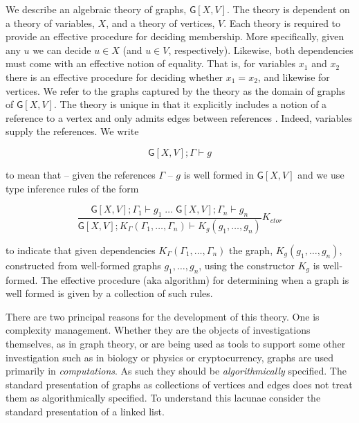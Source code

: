 \documentclass[12pt]{llncs}
\begin{document}
\lstset{language=[Objective]Caml,frame=shadowbox}




We describe an algebraic theory of graphs, \(\mathsf{G}[X,V]\). The
theory is dependent on a theory of variables, \(X\), and a theory of
vertices, \(V\). Each theory is required to provide an effective
procedure for deciding membership. More specifically, given any \(u\) we
can decide \(u \in X\) (and \(u \in V\), respectively). Likewise, both
dependencies must come with an effective notion of equality. That is,
for variables \(x_1\) and \(x_2\) there is an effective procedure for
deciding whether \(x_1 = x_2\), and likewise for vertices. We refer to
the graphs captured by the theory as the domain of graphs of
\(\mathsf{G}[X,V]\). The theory is unique in that it explicitly includes
a notion of a reference to a vertex and only admits edges between
references \cite{DBLP:journals/corr/abs-0809-3023} \cite{DBLP:journals/iandc/DawarGG07} \cite{DBLP:conf/icalp/CardelliGG02} \cite{godsil2013algebraic}. Indeed, variables supply the references. We write

\[\mathsf{G}[X,V];\Gamma \vdash g\]

to mean that -- given the references \(\Gamma\) -- \(g\) is well formed
in \(\mathsf{G}[X,V]\) and we use type inference rules of the form

\[\frac{ \mathsf{G}[X,V]; \Gamma_1 \vdash g_1 \; \ldots \; \mathsf{G}[X,V]; \Gamma_n \vdash g_n}{ \mathsf{G}[X,V]; K_{\Gamma}(\Gamma_1,\ldots,\Gamma_n) \vdash K_g(g_1,\ldots, g_n)}K_{ctor}\]

to indicate that given dependencies
\(K_{\Gamma}(\Gamma_1,\ldots,\Gamma_n)\) the graph,
\(K_g(g_1,\ldots,g_n)\), constructed from well-formed graphs
\(g_1,\ldots,g_n\), using the constructor \(K_g\) is well-formed. The
effective procedure (aka algorithm) for determining when a graph is well
formed is given by a collection of such rules.

There are two principal reasons for the development of this theory. One
is complexity management. Whether they are the objects of investigations
themselves, as in graph theory, or are being used as tools to
support some other investigation such as in biology or physics or
cryptocurrency, graphs are used primarily in \emph{computations}. As
such they should be \emph{algorithmically} specified. The standard
presentation of graphs as collections of vertices and edges does not
treat them as algorithmically specified. To understand this lacunae
consider the standard presentation of a linked list.
\end{document}
